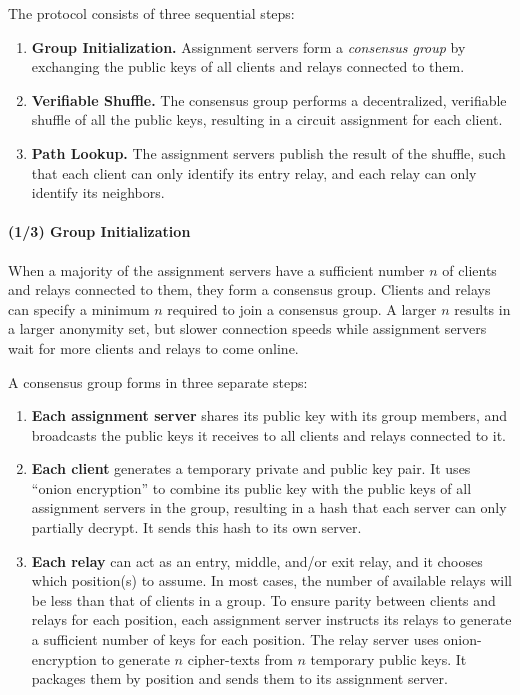 The protocol consists of three sequential steps:

\begin{enumerate}
\item \textbf{Group Initialization.} Assignment servers form a \textit{consensus group} by exchanging the public keys of all clients and relays connected to them. 
\item \textbf{Verifiable Shuffle.} The consensus group performs a decentralized, 
verifiable shuffle of all the public keys, resulting in a circuit assignment for
each client.
\item \textbf{Path Lookup.} The assignment servers publish the result of the 
shuffle, such that each client can only identify its entry relay, and each relay
can only identify its neighbors. 
\end{enumerate}


\paragraph{(1/3) Group Initialization}

When a majority of the assignment servers have a sufficient number $n$ of
clients and relays connected to them, they form a consensus group. Clients and
relays can specify a minimum $n$ required to join a consensus group. A larger
$n$ results in a larger anonymity set, but slower connection speeds while
assignment servers wait for more clients and relays to come online.

A consensus group forms in three separate steps:

\begin{enumerate} 

\item \textbf{Each assignment server} shares its public key with its group
members, and broadcasts the public keys it receives to all clients and relays
connected to it.

\item \textbf{Each client} generates a temporary private and public key pair.
It uses ``onion encryption'' to combine its public key with the public keys of
all assignment servers in the group, resulting in a hash that each server can
only partially decrypt. It sends this hash to its own server.

\item \textbf{Each relay} can act as an entry, middle, and/or exit relay, and
it chooses which position(s) to assume. In most cases, the number of available
relays will be less than that of clients in a group. To ensure parity between
clients and relays for each position, each assignment server instructs its relays to generate a
sufficient number of keys for each position. The relay server uses
onion-encryption to generate $n$ cipher-texts from $n$ temporary public keys.
It packages them by position and sends them to its assignment server.
\end{enumerate}

